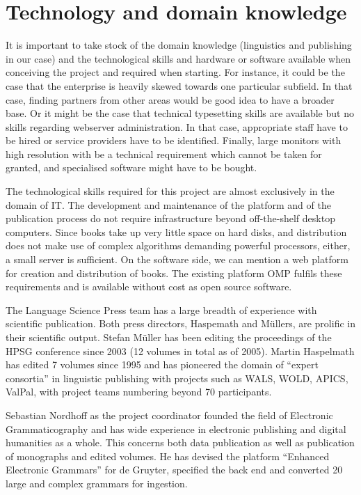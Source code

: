 \documentclass[nonflat,smallfont
]{langsci/langscibook}
\newcommand{\background}[1]{ 
  \vspace{5mm}
  \renewcommand{\tblslinecolour}{lsDarkBlue}
  \tblssy[red]{explore2}{Background}{\vspace*{-5mm}#1}
}
\newcommand{\langscisolution}[1]{
  \renewcommand{\tblslinecolour}{lsLightBlue}
  \tblssy{langsci}{LangSci solution}{\vspace*{-5mm}#1}
}
\renewcommand{\tblssy}[4][black!12]{%
  \renewcommand{\langscisymbol}{#2}\renewcommand{\tblsboxcolor}{#1}
  \begin{mdframed}[style=yellowexercise,frametitle={#3}]
    #4
  \end{mdframed}
}
\begin{document}
\section{Technology and domain knowledge}

\vspace*{5mm}\background{It is important to take stock of the domain knowledge (linguistics and publishing in our case) and the technological skills and hardware or software available when conceiving the project and required when starting. For instance, it could be the case that the enterprise is heavily skewed towards one particular subfield. In that case, finding partners from other areas would be good idea to have a broader base. Or it might be the case that technical typesetting skills are available but no skills regarding webserver administration. In that case, appropriate staff have to be hired or service providers have to be identified. Finally, large monitors with high resolution with be a technical requirement which cannot be taken for granted, and specialised software might have to be bought.}
\langscisolution{
The technological skills required for this project are almost exclusively in the domain of IT. The development and maintenance of the platform and of the publication process do not require infrastructure beyond off-the-shelf desktop computers. Since books take up very little space on hard disks, and distribution does not make use of complex algorithms demanding powerful processors, either, a small server is sufficient. 
On the software side, we can mention a web platform for creation and distribution of books. The existing platform OMP fulfils these requirements and is available without cost as open source software.

The Language Science Press team has a large breadth of experience with scientific publication. Both press directors, Haspemath and Müllers, are prolific in their scientific output. Stefan Müller has been editing the proceedings of the HPSG conference since 2003 (12 volumes in total as of 2005). Martin Haspelmath has edited 7 volumes since 1995 and has pioneered the domain of ``expert consortia'' in linguistic publishing with projects such as WALS, WOLD, APICS, ValPal, with project teams numbering beyond 70 participants. 

Sebastian Nordhoff as the project coordinator founded the field of Electronic Grammaticography and has wide experience in electronic publishing and digital humanities as a whole. This concerns both data publication as well as publication of monographs and edited volumes. He has devised the platform ``Enhanced Electronic Grammars'' for de Gruyter, specified the back end and converted 20 large and complex grammars for ingestion.
}
\end{document}
